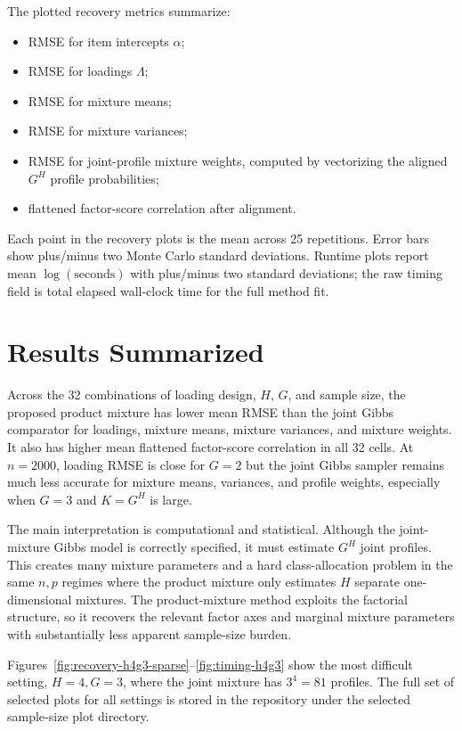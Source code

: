 \documentclass[11pt]{article}
\begin{document}
The plotted recovery metrics summarize:
\begin{itemize}[leftmargin=*]
  \item RMSE for item intercepts $\alpha$;
  \item RMSE for loadings $\Lambda$;
  \item RMSE for mixture means;
  \item RMSE for mixture variances;
  \item RMSE for joint-profile mixture weights, computed by vectorizing the aligned $G^H$
        profile probabilities;
  \item flattened factor-score correlation after alignment.
\end{itemize}
Each point in the recovery plots is the mean across 25 repetitions. Error bars show plus/minus
two Monte Carlo standard deviations. Runtime plots report mean $\log(\mathrm{seconds})$ with
plus/minus two standard deviations; the raw timing field is total elapsed wall-clock time for the
full method fit.

\section{Results Summarized}

Across the 32 combinations of loading design, $H$, $G$, and sample size, the proposed product
mixture has lower mean RMSE than the joint Gibbs comparator for loadings, mixture means, mixture
variances, and mixture weights. It also has higher mean flattened factor-score correlation in all
32 cells. At $n=2000$, loading RMSE is close for $G=2$ but the joint Gibbs sampler remains much
less accurate for mixture means, variances, and profile weights, especially when $G=3$ and
$K=G^H$ is large.

The main interpretation is computational and statistical. Although the joint-mixture Gibbs model
is correctly specified, it must estimate $G^H$ joint profiles. This creates many mixture
parameters and a hard class-allocation problem in the same $n,p$ regimes where the product
mixture only estimates $H$ separate one-dimensional mixtures. The product-mixture method exploits
the factorial structure, so it recovers the relevant factor axes and marginal mixture parameters
with substantially less apparent sample-size burden.

Figures~\ref{fig:recovery-h4g3-sparse}--\ref{fig:timing-h4g3} show the most difficult setting,
$H=4,G=3$, where the joint mixture has $3^4=81$ profiles. The full set of selected plots for all
settings is stored in the repository under the selected sample-size plot directory.
\end{document}
